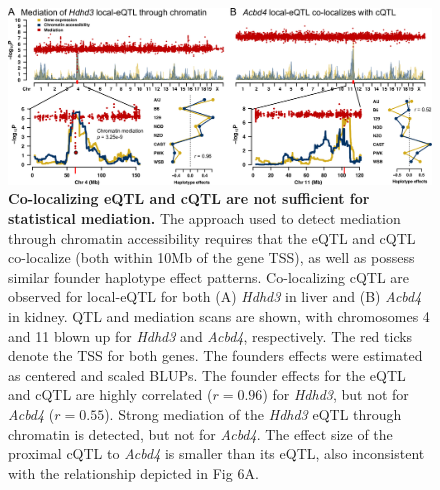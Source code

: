 \documentclass[10pt,letterpaper,twoside]{article}
\begin{document}
\clearpage

\begin{figure}[hp]
\renewcommand{\familydefault}{\sfdefault}\normalfont
\centering
\includegraphics[width=\textwidth]{figs/mediation_or_colocal.png}
\caption{\textbf{Co-localizing eQTL and cQTL are not sufficient for statistical mediation.} 
The approach used to detect mediation through chromatin accessibility requires that the eQTL and cQTL co-localize (both within 10Mb of the gene TSS), as well as possess similar founder haplotype effect patterns. Co-localizing cQTL are observed for local-eQTL for both (A) \textit{Hdhd3} in liver and (B) \textit{Acbd4} in kidney. QTL and mediation scans are shown, with chromosomes 4 and 11 blown up for \textit{Hdhd3} and \textit{Acbd4}, respectively. The red ticks denote the TSS for both genes. The founders effects were estimated as centered and scaled BLUPs. The founder effects for the eQTL and cQTL are highly correlated ($r = 0.96$) for \textit{Hdhd3}, but not for \textit{Acbd4} ($r = 0.55$). Strong mediation of the \textit{Hdhd3} eQTL through chromatin is detected, but not for \textit{Acbd4}. The effect size of the proximal cQTL to \textit{Acbd4} is smaller than its eQTL, also inconsistent with the relationship depicted in Fig 6A.
\label{fig:colocalization}}
\end{figure}

\clearpage
\end{document}

